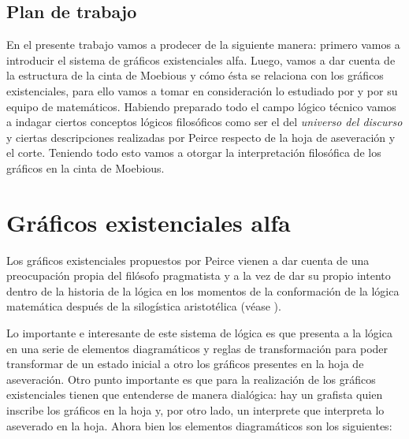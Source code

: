 \documentclass[
	fontsize=10pt, %
	twoside=true, %
	secnumdepth=1, %
	abstract=true, %
]{kaohandt}
\begin{document}
\subsection{Plan de trabajo} %
\label{sub:Plan de trabajo}
En el presente trabajo vamos a prodecer de la siguiente manera: primero vamos a introducir el sistema de gráficos existenciales alfa. Luego, vamos a dar cuenta de la estructura de la cinta de Moebious y cómo ésta se relaciona con los gráficos existenciales, para ello vamos a tomar en consideración lo estudiado por \cite{oostra2023} y por su equipo de matemáticos. Habiendo preparado todo el campo lógico técnico vamos a indagar ciertos conceptos lógicos filosóficos como ser el del \textit{universo del discurso} y ciertas descripciones realizadas por Peirce respecto de la hoja de aseveración y el corte. Teniendo todo esto vamos a otorgar la interpretación filosófica de los gráficos en la cinta de Moebious.



\section{Gráficos existenciales alfa}

Los gráficos existenciales propuestos por Peirce vienen a dar cuenta de una preocupación propia del filósofo pragmatista y a la vez de dar su propio intento dentro de la historia de la lógica en los momentos de la conformación de la lógica matemática después de la silogística aristotélica (véase \cite{brady2011}).

Lo importante e interesante de este sistema de lógica es que presenta a la lógica en una serie de elementos diagramáticos y reglas de transformación para poder transformar de un estado inicial a otro los gráficos presentes en la hoja de aseveración. Otro punto importante es que para la realización de los gráficos existenciales tienen que entenderse de manera dialógica: hay un grafista quien inscribe los gráficos en la hoja y, por otro lado, un interprete que interpreta lo aseverado en la hoja. Ahora bien los elementos diagramáticos son los siguientes:
\end{document}
